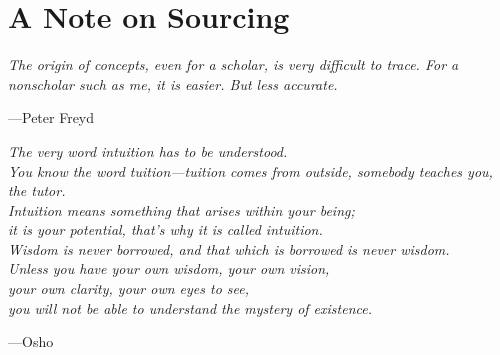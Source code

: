 \newpage


\part*{A Note on Sourcing}

\begin{displayquote}
	\textit{The origin of concepts, even for a scholar, is very difficult to trace. For a nonscholar such as me, it is easier. But less accurate.}
	\begin{flushright}
		---Peter Freyd
	\end{flushright}
	\vspace{4mm}
\end{displayquote}


\newpage


\vspace*{4cm}
\begin{center}
\textit{The very word intuition has to be understood. \\[5mm]
	You know the word tuition—tuition comes from outside, somebody teaches you, the tutor. \\[5mm]
	Intuition means something that arises within your being; \\[5mm]
	it is your potential, that’s why it is called intuition. \\[5mm]
	Wisdom is never borrowed, and that which is borrowed is never wisdom. \\[5mm]
	Unless you have your own wisdom, your own vision, \\[5mm]
	your own clarity, your own eyes to see, \\[5mm]
	you will not be able to understand the mystery of existence.}
\begin{flushright}
	---Osho
\end{flushright}
\end{center}

